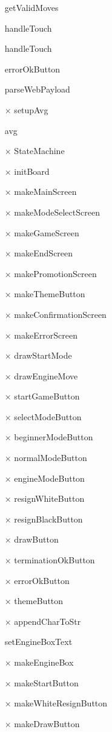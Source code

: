 \documentclass[12pt, titlepage]{article}
\begin{document}
\begin{itemize}
  \item[\checkmark] getValidMoves
  \item[\checkmark] handleTouch
  \item[\checkmark] handleTouch
  \item[\checkmark] errorOkButton
  \item[\checkmark] parseWebPayload
  \item[$\times$] setupAvg
  \item[\checkmark] avg
  \item[$\times$] StateMachine
  \item[$\times$] initBoard
  \item[$\times$] makeMainScreen
  \item[$\times$] makeModeSelectScreen
  \item[$\times$] makeGameScreen
  \item[$\times$] makeEndScreen
  \item[$\times$] makePromotionScreen
  \item[$\times$] makeThemeButton
  \item[$\times$] makeConfirmationScreen
  \item[$\times$] makeErrorScreen
  \item[$\times$] drawStartMode
  \item[$\times$] drawEngineMove
  \item[$\times$] startGameButton
  \item[$\times$] selectModeButton
  \item[$\times$] beginnerModeButton
  \item[$\times$] normalModeButton
  \item[$\times$] engineModeButton
  \item[$\times$] resignWhiteButton
  \item[$\times$] resignBlackButton
  \item[$\times$] drawButton
  \item[$\times$] terminationOkButton
  \item[$\times$] errorOkButton
  \item[$\times$] themeButton
  \item[$\times$] appendCharToStr
  \item[\checkmark] setEngineBoxText
  \item[$\times$] makeEngineBox
  \item[$\times$] makeStartButton
  \item[$\times$] makeWhiteResignButton
  \item[$\times$] makeDrawButton

\end{itemize}
\end{document}
